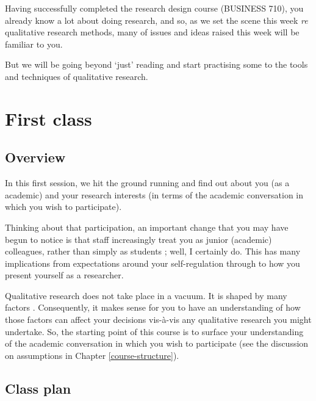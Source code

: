 \documentclass[]{book}
\theoremstyle{definition}
\theoremstyle{definition}
\theoremstyle{definition}
\theoremstyle{remark}
\begin{document}
Having successfully completed the research design course (BUSINESS 710),
you already know a lot about doing research, and so, as we set the scene
this week \emph{re} qualitative research methods, many of issues and
ideas raised this week will be familiar to you.

But we will be going beyond `just' reading and start practising some to
the tools and techniques of qualitative research.

\hypertarget{first-class}{%
\section*{First class}\label{first-class}}

\hypertarget{overview}{%
\subsection*{Overview}\label{overview}}

In this first session, we hit the ground running and find out about you
(as a academic) and your research interests (in terms of the academic
conversation in which you wish to participate).

Thinking about that participation, an important change that you may have
begun to notice is that staff increasingly treat you as junior
(academic) colleagues, rather than simply as students
\autocite{breuer_2007_issueslearningteaching}; well, I certainly do.
This has many implications from expectations around your self-regulation
\autocite{schunk_2005_selfregulatedlearningeducational} through to how
you present yourself as a researcher.

Qualitative research does not take place in a vacuum. It is shaped by
many factors \autocite[e.g.,][
p.86]{huff_2009_designingresearchpublication}. Consequently, it makes
sense for you to have an understanding of how those factors can affect
your decisions vis-à-vis any qualitative research you might undertake.
So, the starting point of this course is to surface your understanding
of the academic conversation in which you wish to participate (see the
discussion on assumptions in Chapter \ref{course-structure}).

\hypertarget{class-plan}{%
\subsection*{Class plan}\label{class-plan}}
\end{document}

